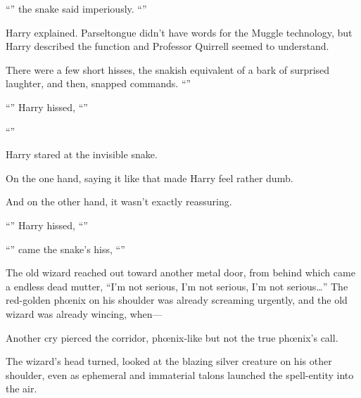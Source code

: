 “” the snake said imperiously. “”

Harry explained. Parseltongue didn’t have words for the Muggle technology, but Harry described the function and Professor Quirrell seemed to understand.

There were a few short hisses, the snakish equivalent of a bark of surprised laughter, and then, snapped commands. “”

“” Harry hissed, “”

“”

Harry stared at the invisible snake.

On the one hand, saying it like that made Harry feel rather dumb.

And on the other hand, it wasn’t exactly reassuring.

“” Harry hissed, “”

“” came the snake’s hiss, “”

\later

The old wizard reached out toward another metal door, from behind which came a endless dead mutter, “I’m not serious, I’m not serious, I’m not serious…” The red-golden phœnix on his shoulder was already screaming urgently, and the old wizard was already wincing, when—

Another cry pierced the corridor, phœnix-like but not the true phœnix’s call.

The wizard’s head turned, looked at the blazing silver creature on his other shoulder, even as ephemeral and immaterial talons launched the spell-entity into the air.

